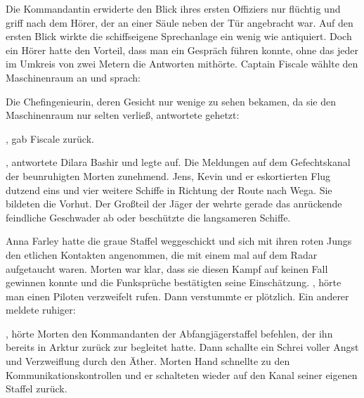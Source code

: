 \par

Die Kommandantin erwiderte den Blick ihres ersten Offiziers nur flüchtig und griff nach dem Hörer, der an einer Säule neben der Tür angebracht war. Auf den ersten Blick wirkte die schiffseigene Sprechanlage ein wenig wie antiquiert. Doch ein Hörer hatte den Vorteil, dass man ein Gespräch führen konnte, ohne das jeder im Umkreis von zwei Metern die Antworten mithörte. Captain Fiscale wählte den Maschinenraum an und sprach: 

\par

Die Chefingenieurin, deren Gesicht nur wenige zu sehen bekamen, da sie den Maschinenraum nur selten verließ, antwortete gehetzt: 

\par

, gab Fiscale zurück. 

\par

, antwortete Dilara Bashir und legte auf.
\ortswechsel
Die Meldungen auf dem Gefechtskanal der  beunruhigten Morten zunehmend. Jens, Kevin und er eskortierten Flug dutzend eins und vier weitere Schiffe in Richtung der Route nach Wega. Sie bildeten die Vorhut. Der Großteil der Jäger der  wehrte gerade das anrückende feindliche Geschwader ab oder beschützte die langsameren Schiffe.

\par

Anna Farley hatte die graue Staffel weggeschickt und sich mit ihren roten Jungs den etlichen Kontakten angenommen, die mit einem mal auf dem Radar aufgetaucht waren. Morten war klar, dass sie diesen Kampf auf keinen Fall gewinnen konnte und die Funksprüche bestätigten seine Einschätzung. , hörte man einen Piloten verzweifelt rufen. Dann verstummte er plötzlich. Ein anderer meldete ruhiger: 

\par

, hörte Morten den Kommandanten der Abfangjägerstaffel befehlen, der ihn bereits in Arktur zurück zur  begleitet hatte. Dann schallte ein Schrei voller Angst und Verzweiflung durch den Äther. Morten Hand schnellte zu den Kommunikationskontrollen und er schalteten wieder auf den Kanal seiner eigenen Staffel zurück.

